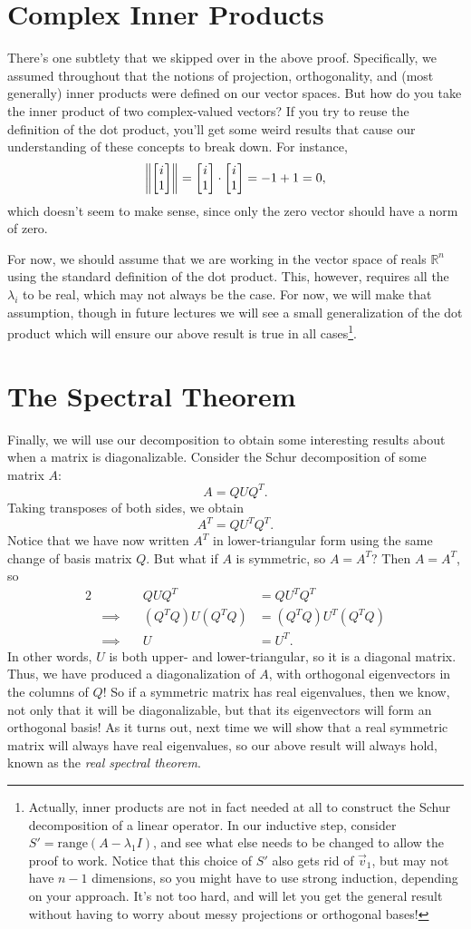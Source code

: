 \documentclass[letterpaper]{article}
\theoremstyle{remark}
\newcommand{\mat}[1]{\ensuremath{\begin{bmatrix}#1\end{bmatrix}}}
\newcommand{\eqn}[1]{\begin{alignat*}{2}#1\end{alignat*}}
\newcommand*{\thus}{&\implies\quad&}
\begin{document}
\section{Complex Inner Products}
There's one subtlety that we skipped over in the above proof. Specifically, we assumed throughout that the notions of projection, orthogonality, and (most generally) inner products were defined on our vector spaces. But how do you take the inner product of two complex-valued vectors? If you try to reuse the definition of the dot product, you'll get some weird results that cause our understanding of these concepts to break down. For instance,
\[
    \norm{\mat{i \\ 1}} = \mat{i \\ 1} \cdot \mat{i \\ 1} = -1 + 1 = 0,
\]
which doesn't seem to make sense, since only the zero vector should have a norm of zero.

For now, we should assume that we are working in the vector space of reals $\mathbb{R}^n$ using the standard definition of the dot product. This, however, requires all the $\lambda_i$ to be real, which may not always be the case. For now, we will make that assumption, though in future lectures we will see a small generalization of the dot product which will ensure our above result is true in all cases\footnote{Actually, inner products are not in fact needed at all to construct the Schur decomposition of a linear operator. In our inductive step, consider $S' = \mathrm{range}(A - \lambda_1 I)$, and see what else needs to be changed to allow the proof to work. Notice that this choice of $S'$ also gets rid of $\vec{v}_1$, but may not have $n-1$ dimensions, so you might have to use strong induction, depending on your approach. It's not too hard, and will let you get the general result without having to worry about messy projections or orthogonal bases!}.

\section{The Spectral Theorem}
Finally, we will use our decomposition to obtain some interesting results about when a matrix is diagonalizable. Consider the Schur decomposition of some matrix $A$:
\[
    A = QUQ^T.
\]
Taking transposes of both sides, we obtain
\[
    A^T = QU^TQ^T.
\]
Notice that we have now written $A^T$ in lower-triangular form using the same change of basis matrix $Q$. But what if $A$ is symmetric, so $A = A^T$? Then $A = A^T$, so
\eqn{
    && QUQ^T &= QU^TQ^T \\
    \thus (Q^TQ)U(Q^TQ) &= (Q^TQ)U^T(Q^TQ) \\
    \thus U &= U^T.
}
In other words, $U$ is both upper- and lower-triangular, so it is a diagonal matrix. Thus, we have produced a diagonalization of $A$, with orthogonal eigenvectors in the columns of $Q$! So if a symmetric matrix has real eigenvalues, then we know, not only that it will be diagonalizable, but that its eigenvectors will form an orthogonal basis! As it turns out, next time we will show that a real symmetric matrix will always have real eigenvalues, so our above result will always hold, known as the \emph{real spectral theorem}.
\end{document}
